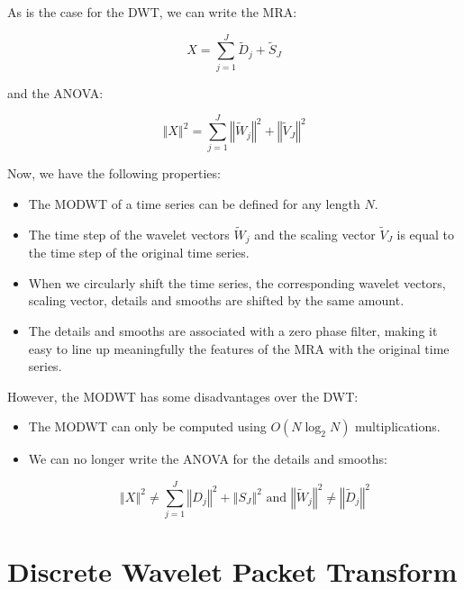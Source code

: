 \documentclass[methods.tex]{subfiles}
\begin{document}
As is the case for the DWT, we can write the MRA:

\begin{equation}
X = \sum_{j = 1}^{J} \widetilde{D}_j + \widetilde{S}_J
\end{equation}

and the ANOVA:

\begin{equation}
\left\Vert X \right\Vert ^2 = \sum_{j = 1}^{J} \left\Vert \widetilde{W}_j \right\Vert ^2 + \left\Vert \widetilde{V}_J \right\Vert ^2
\end{equation}

Now, we have the following properties:

\begin{itemize}
	\item The MODWT of a time series can be defined for any length $N$.
	\item The time step of the wavelet vectors $\widetilde{W}_j$ and the scaling vector $\widetilde{V}_J$ is equal to the time step of the original time series.
	\item When we circularly shift the time series, the corresponding wavelet vectors, scaling vector, details and smooths are shifted by the same amount.
	\item The details and smooths are associated with a zero phase filter, making it easy to line up meaningfully the features of the MRA with the original time series.
\end{itemize}

However, the MODWT has some disadvantages over the DWT:

\begin{itemize}
	\item The MODWT can only be computed using $O \left( N \log_2 N \right)$ multiplications.
	\item We can no longer write the ANOVA for the details and smooths:

\begin{equation}
\left\Vert X \right\Vert ^2 \neq \sum_{j = 1}^{J} \left\Vert D_j \right\Vert ^2 + \left\Vert S_J \right\Vert ^2 \text{ and } \left\Vert \widetilde{W}_j \right\Vert ^2 \neq \left\Vert \widetilde{D}_j \right\Vert ^2
\end{equation}

\end{itemize}

\section{Discrete Wavelet Packet Transform}
\end{document}
